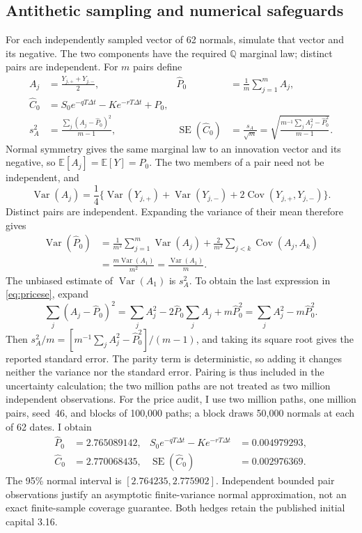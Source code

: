 \documentclass[11pt,a4paper]{article}
\newcommand{\E}{\mathbb E}
\newcommand{\Q}{\mathbb Q}
\newcommand{\SE}{\operatorname{SE}}
\newcommand{\Var}{\operatorname{Var}}
\newcommand{\Cov}{\operatorname{Cov}}
\newcommand{\dt}{\Delta t}
\theoremstyle{remark}
\begin{document}
\subsection{Antithetic sampling and numerical safeguards}
For each independently sampled vector of 62 normals, simulate that vector and its negative. The two components have the required $\Q$ marginal law; distinct pairs are independent. For $m$ pairs define
\begin{align}
 A_j&=\frac{Y_{j,+}+Y_{j,-}}2,&
 \widehat P_0&=\frac1m\sum_{j=1}^mA_j,\nonumber\\
 \widehat C_0&=S_0e^{-qT\dt}-Ke^{-rT\dt}+\widehat P_0,\label{eq:priceestimator}\\
 s_A^2&=\frac{\sum_j(A_j-\widehat P_0)^2}{m-1},&
 \SE(\widehat C_0)&=\frac{s_A}{\sqrt m}
 =\sqrt{\frac{m^{-1}\sum_jA_j^2-\widehat P_0^2}{m-1}}.
 \label{eq:pricese}
\end{align}
Normal symmetry gives the same marginal law to an innovation vector and its negative, so $\E[A_j]=\E[Y]=P_0$. The two members of a pair need not be independent, and
\begin{equation}
 \Var(A_j)=\frac14\{\Var(Y_{j,+})+\Var(Y_{j,-})
                         +2\Cov(Y_{j,+},Y_{j,-})\}.
\end{equation}
Distinct pairs are independent. Expanding the variance of their mean therefore gives
\begin{align}
 \Var(\widehat P_0)
 &=\frac1{m^2}\sum_{j=1}^m\Var(A_j)
   +\frac2{m^2}\sum_{j<k}\Cov(A_j,A_k)\nonumber\\
 &=\frac{m\Var(A_1)}{m^2}=\frac{\Var(A_1)}m.
\end{align}
The unbiased estimate of $\Var(A_1)$ is $s_A^2$. To obtain the last expression in \eqref{eq:pricese}, expand
\begin{equation}
 \sum_j(A_j-\widehat P_0)^2
 =\sum_j A_j^2-2\widehat P_0\sum_j A_j+m\widehat P_0^2
 =\sum_j A_j^2-m\widehat P_0^2.
\end{equation}
Then $s_A^2/m=[m^{-1}\sum_jA_j^2-\widehat P_0^2]/(m-1)$, and taking its square root gives the reported standard error. The parity term is deterministic, so adding it changes neither the variance nor the standard error. Pairing is thus included in the uncertainty calculation; the two million paths are not treated as two million independent observations. For the price audit, I use two million paths, one million pairs, seed~46, and blocks of 100,000 paths; a block draws 50,000 normals at each of 62 dates. I obtain
\begin{align}
 \widehat P_0&=2.765089142,&
 S_0e^{-qT\dt}-Ke^{-rT\dt}&=0.004979293,\nonumber\\
 \widehat C_0&=2.770068435,& \SE(\widehat C_0)&=0.002976369.
 \label{eq:pricevalue}
\end{align}
The 95\% normal interval is $[2.764235,2.775902]$. Independent bounded pair observations justify an asymptotic finite-variance normal approximation, not an exact finite-sample coverage guarantee. Both hedges retain the published initial capital 3.16.
\end{document}
